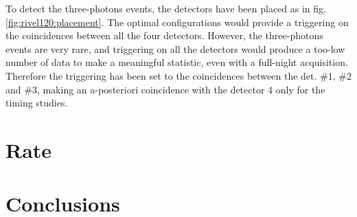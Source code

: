 \documentclass[11pt,a4 paper]{article}
\begin{document}
To detect the three-photons events, the detectors have been placed as in fig. \ref{fig:rivel120:placement}. The optimal configurations would provide a triggering on the coincidences between all the four detectors. However, the three-photons events are very rare, and triggering on all the detectors would produce a too-low number of data to make a meaningful statistic, even with a full-night acquisition. Therefore the triggering has been set to the coincidences between the det. \#1, \#2 and \#3, making an a-posteriori coincidence with the detector 4 only for the timing studies.


\section{Rate}


\section{Conclusions}
\end{document}
